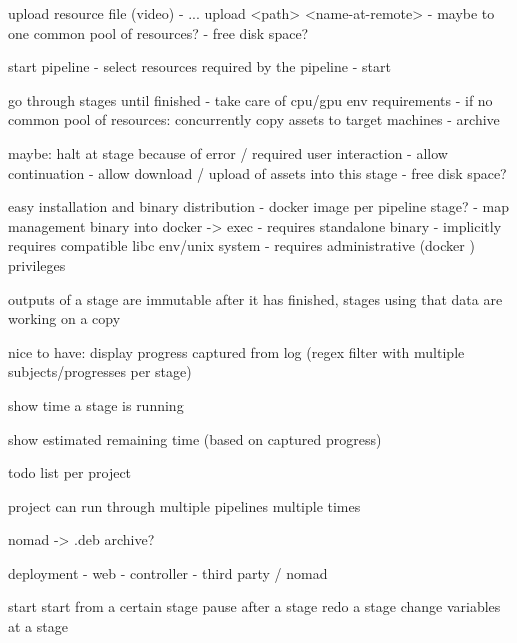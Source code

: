 upload resource file (video)
 - ... upload <path> <name-at-remote>
 - maybe to one common pool of resources?
    - free disk space?

start pipeline
 - select resources required by the pipeline
 - start
 
go through stages until finished
 - take care of cpu/gpu env requirements
 - if no common pool of resources: concurrently copy assets to target machines
 - archive 

maybe: halt at stage because of error / required user interaction
 - allow continuation
 - allow download / upload of assets into this stage
    - free disk space?
 
 
 easy installation and binary distribution
  - docker image per pipeline stage?
  - map management binary into docker -> exec
     - requires standalone binary
     - implicitly requires compatible libc env/unix system
     - requires administrative (docker ) privileges
     
 
 outputs of a stage are immutable after it has finished, stages using that data are working on a copy
 
 nice to have: display progress captured from log (regex filter with multiple subjects/progresses per stage)
 
 show time a stage is running
 
 show estimated remaining time (based on captured progress)
     
  todo list per project
  
  project can run through multiple pipelines multiple times
  
  nomad -> .deb archive?
  
deployment
 - web
 - controller
 - third party / nomad
     
start
start from a certain stage
pause after a stage
redo a stage
change variables at a stage